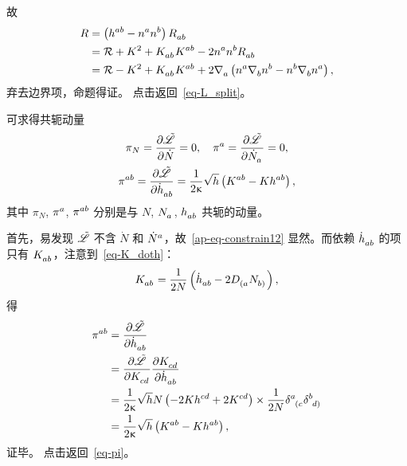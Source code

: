 \begin{Proof}
			故
			\begin{equation*}
				\begin{split}
					R &= \left( \tensor{h}{^a^b} - \tensor{n}{^a}\tensor{n}{^b} \right) \tensor{R}{_a_b}\\
					&= \spacecurR + K^2 + \tensor{K}{_a_b} \tensor{K}{^a^b} - 2 \tensor{n}{^a} \tensor{n}{^b} \tensor{R}{_a_b}\\
					&= \spacecurR - K^2 + \tensor{K}{_a_b} \tensor{K}{^a^b} + 2 \Nabla{a} \left( \tensor{n}{^a} \Nabla{b} \tensor{n}{^b} - \tensor{n}{^b} \Nabla{b} \tensor{n}{^a} \right),
				\end{split}
			\end{equation*}
			弃去边界项，命题得证。
			{\normalfont\ttfamily\color{green} 点击返回~\eqref{eq-L_split}。}
		\end{Proof}

		\begin{Property}
			可求得共轭动量
			\begin{gather}
				\pi_N = \pdv{\Lad}{\dot{N}} = 0 \qc \tensor{\pi}{^a} = \pdv{\Lad}{\tensor{\dot{N}}{_a}} = 0, \label{ap-eq-constrain12}\\
				\tensor{\pi}{^a^b} = \pdv{\Lad}{\tensor{\dot{h}}{_a_b}} = \frac{1}{2\gkappa} \sqrt{h} \left( \tensor{K}{^a^b} - K \tensor{h}{^a^b} \right), \label{ap-eq-pi}
			\end{gather}
			其中 $\pi_N$, $\tensor{\pi}{^a}$, $\tensor{\pi}{^a^b}$ 分别是与 $N$, $\tensor{N}{_a}$, $\tensor{h}{_a_b}$ 共轭的动量。
		\end{Property}
		
		\begin{Proof}
			\label{ap-eq-pi}
			首先，易发现 $\tilde{\mathscr{L}}$ 不含 $\dot{N}$ 和 $\tensor{\dot{N}}{^a}$，故~\eqref{ap-eq-constrain12} 显然。而依赖 $\tensor{\dot{h}}{_a_b}$ 的项只有 $\tensor{K}{_a_b}$，注意到~\eqref{eq-K_doth}：
			\begin{equation*}
				\tensor{K}{_a_b} = \frac{1}{2N} \left( \tensor{\dot{h}}{_a_b} - 2 \tensor{D}{_{(a}} \tensor{N}{_{b)}} \right),
			\end{equation*}
			得
			\begin{equation}
				\begin{split}
					\tensor{\pi}{^a^b} &= \pdv{\Lad}{\tensor{\dot{h}}{_a_b}}\\
					&= \pdv{\Lad}{\tensor{K}{_c_d}} \pdv{\tensor{K}{_c_d}}{\tensor{\dot{h}}{_a_b}}\\
					&= \frac{1}{2\gkappa} \sqrt{h} N \left( - 2 K \tensor{h}{^c^d} + 2 \tensor{K}{^c^d} \right) \times \frac{1}{2N} \tensor{\delta}{^a_{(c}} \tensor{\delta}{^b_{d)}}\\
					&= \frac{1}{2\gkappa} \sqrt{h} \left( \tensor{K}{^a^b} - K \tensor{h}{^a^b} \right),
				\end{split}
			\end{equation}
			证毕。
			{\normalfont\ttfamily\color{green} 点击返回~\eqref{eq-pi}。}
		\end{Proof}

